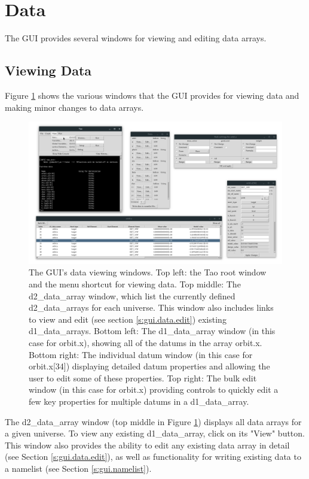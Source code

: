 \section{Data}
\label{s:gui.data}

The GUI provides several windows for viewing and editing data arrays.

\subsection{Viewing Data}
\label{s:gui.data.view}

Figure \ref{fig:gui.data.view} shows the various windows that the GUI provides for viewing data and making minor changes to data arrays.
\begin{figure}
\centering
\includegraphics[width=12cm]{figures/view_data.png}
\caption{The GUI's data viewing windows.
Top left: the Tao root window and the menu shortcut for viewing data.
Top middle: The d2_data_array window, which list the currently defined d2_data_arrays for each universe.
This window also includes links to view and edit (see section \ref{s:gui.data.edit}) existing d1_data_arrays.
Bottom left: The d1_data_array window (in this case for orbit.x), showing all of the datums in the array orbit.x.
Bottom right: The individual datum window (in this case for orbit.x[34]) displaying detailed datum properties and allowing the user to edit some of these properties.
Top right: The bulk edit window (in this case for orbit.x) providing controls to quickly edit a few key properties for multiple datums in a d1_data_array.}
\label{fig:gui.data.view}
\end{figure}

The d2_data_array window (top middle in Figure \ref{fig:gui.data.view}) displays all data arrays for a given universe.
To view any existing d1_data_array, click on its "View" button.
This window also provides the ability to edit any existing data array in detail (see Section \ref{s:gui.data.edit}), as well as functionality for writing existing data to a namelist (see Section \ref{s:gui.namelist}).

